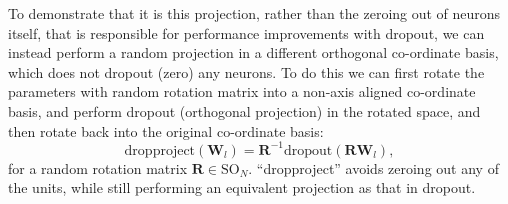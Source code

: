 \documentclass[thesis]{subfiles}
\begin{document}
To demonstrate that it is this projection, rather than the zeroing out of neurons itself, that is responsible for performance improvements with dropout, we can instead perform a random projection in a different orthogonal co-ordinate basis, which does not dropout (zero) any neurons. To do this we can first rotate the parameters with random rotation matrix into a non-axis aligned co-ordinate basis, and perform dropout (orthogonal projection) in the rotated space, and then rotate back into the original co-ordinate basis:
\begin{equation}
    \textrm{dropproject}(\mathbf{W}_l) = \mathbf{R}^{-1}\textrm{dropout}(\mathbf{R} \mathbf{W}_l),
\end{equation}
for a random rotation matrix $\mathbf{R}\in \textrm{SO}_N$. ``dropproject'' avoids zeroing out any of the units, while still performing an equivalent projection as that in dropout.
\end{document}
